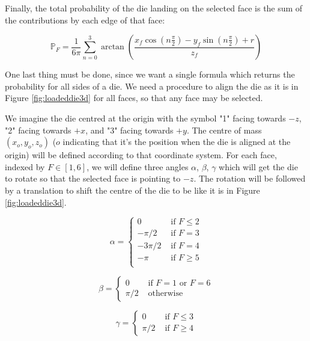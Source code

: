 \documentclass[english,12pt,a4paper,final]{article}
\begin{document}
Finally, the total probability of the die landing on the selected face is the sum of the contributions by each edge of that face:

\begin{equation}\label{dieFaceProb}
	\mathbb{P}_F = \frac{1}{6\pi} \sum_{n=0}^{3} \arctan\left(\frac{x_f\cos(n\frac{\pi}{2})-y_f\sin(n\frac{\pi}{2})+r}{z_f}\right)
\end{equation}

One last thing must be done, since we want a single formula which returns the probability for all sides of a die. We need a procedure to align the die as it is in Figure \ref{fig:loadeddie3d} for all faces, so that any face may be selected.

We imagine the die centred at the origin with the symbol "1" facing towards $-z$, "2" facing towards $+x$, and "3" facing towards $+y$. The centre of mass $(x_o, y_o, z_o)$ ($o$ indicating that it's the position when the die is aligned at the origin) will be defined according to that coordinate system. For each face, indexed by $F \in [1, 6] $, we will define three angles $\alpha$, $\beta$, $\gamma$ which will get the die to rotate so that the selected face is pointing to $-z$. The rotation will be followed by a translation to shift the centre of the die to be like it is in Figure \ref{fig:loadeddie3d}.

\begin{equation*}
	\alpha = \begin{cases} 
		0 & \text{ if } F \le 2 \\
		-\pi/2 & \text{ if } F = 3 \\
		-3\pi/2 & \text{ if } F = 4 \\
		-\pi & \text{ if } F \ge 5  \\
	\end{cases}
\end{equation*}

\begin{equation*}
	\beta = \begin{cases} 
		0 & \text{ if } F = 1 \text{ or } F = 6 \\
		\pi/2 & \text{ otherwise }
	\end{cases}
\end{equation*}

\begin{equation*}
	\gamma = \begin{cases} 
		0 & \text{ if } F \le 3 \\
		\pi/2 & \text{ if } F \ge 4
	\end{cases}
\end{equation*}	
\end{document}

